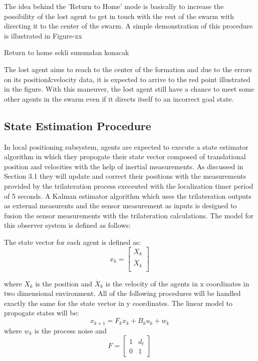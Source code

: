 \documentclass[twoside]{article}
\begin{document}
	The idea behind the 'Return to Home' mode is basically to increase the possibility of the lost agent to get in touch with the rest of the swarm with directing it to the center of the swarm. A simple demonstration of this procedure is illustrated in Figure-xx
	
	
	Return to home sekli sunumdan konacak
	
	
	The lost agent aims to reach to the center of the formation and due to the errors on its position$\&$velocity data, it is expected to arrive to the red point illustrated in the figure. With this maneuver, the lost agent still have a chance to meet some other agents in the swarm even if it directs itself to an incorrect goal state. 
	
	
	\subsection{State Estimation Procedure}
	In local positioning subsystem, agents are expected to execute a state estimator algorithm in which they propogate their state vector composed of translational position and velocities with the help of inertial measurements. As discussed in Section 3.1 they will update and correct their positions with the measurements provided by the trilateration process execeuted with the localization timer period of 5 seconds. A Kalman estimator algorithm which uses the trilateration outputs as external measurents and the sensor measurement as inputs is designed to fusion the sensor measurements with the trilateration calculations. The model for this observer system is defined as follows:
	
	The state vector for each agent is defined as:
	\begin{equation}
        x_k = \begin{bmatrix}
            X_k \\
            \dot{X}_k\\
                \end{bmatrix}
	\end{equation}
	
	where $X_k$ is the position and $\dot{X}_k$ is the velocity of the agents in x coordinates in two dimensional environment. All of the following procedures will be handled exactly the same for the state vector in y coordinates.
	The linear model to propogate states will be:
	\begin{equation}
  x_{k+1} = F_kx_{k} + B_ku_k + w_k
	\end{equation}
	where $w_k$ is the process noise and 
	\begin{equation}
   F = \begin{bmatrix}
1 & d_t\\
0 & 1
\end{bmatrix}   
	\end{equation}
	
\end{document}
